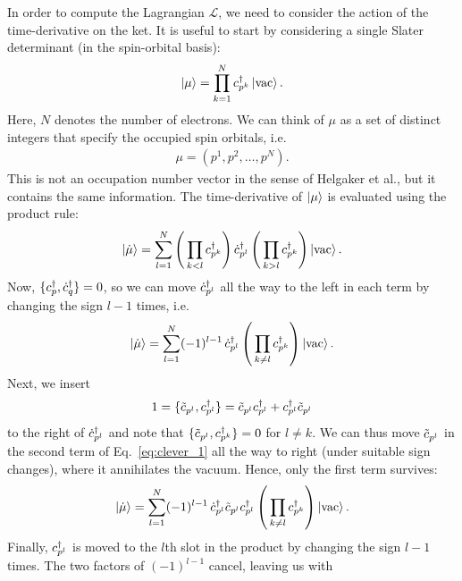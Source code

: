 \documentclass[aip,jcp,preprint,superscriptaddress,nofootinbib]{revtex4-1}
\begin{document}
In order to compute the Lagrangian $\mathcal{L}$, we need to consider
the action of the time-derivative on the ket. It is useful to start by
considering a single Slater determinant (in the spin-orbital basis):
\begin{align}
    \ket{\mu} = \prod_{k=1}^N c^{\dagger}_{p^{\smash{k}}} \ket{\mathrm{vac}}.
\end{align}
Here, $N$ denotes the number of electrons. 
We can think
of $\mu$ as a set of distinct integers that specify
the occupied spin orbitals, i.e.
\begin{align}
    \mu = (p^1, p^2, \ldots, p^N).
\end{align}
This is not an occupation number vector
in the sense of Helgaker et al.,\cite{helgakerMolecularElectronicstructureTheory2000}
but it contains the same information.
The time-derivative of
$\ket{\mu}$ is evaluated using the product rule:
\begin{align}
    \ket{\dot{\mu}} = \sum_{l=1}^{N} \left( \, \prod_{k < l} c^{\dagger}_{p^{\smash{k}}} \right) \dot{c}^{\dagger}_{p^{\smash{l}}} \left( \, \prod_{k > l} c^{\dagger}_{p^{\smash{k}}} \right) \ket{\mathrm{vac}}.
\end{align}
Now, $\{ c^{\dagger}_{p}, \dot{c}^{\dagger}_{q} \} = 0$, so we can move $\dot{c}^{\dagger}_{p^{\smash{l}}}$ all the way to the left in each term
by changing the sign $l - 1$ times, i.e.
\begin{align}
    \ket{\dot{\mu}} = \sum_{l=1}^{N} (-1)^{l-1} \, \dot{c}^{\dagger}_{p^{\smash{l}}} \left( \, \prod_{k \neq l} c^{\dagger}_{p^{\smash{k}}} \right) \ket{\mathrm{vac}}.
\end{align}
Next, we insert
\begin{align} \label{eq:clever_1}
    1 = \{ \tilde{c}_{{p}^{l}}, c^{\dagger}_{p^{\smash{l}}} \} = \tilde{c}_{{p}^{l}} c^{\dagger}_{p^{\smash{l}}} + c^{\dagger}_{p^{\smash{l}}} \tilde{c}_{{p}^{l}}
\end{align}
to the right of $\dot{c}^{\dagger}_{p^{\smash{l}}}$ and note that $\{ \tilde{c}_{{p}^{l}}, c^{\dagger}_{p^{\smash{k}}} \} = 0$ for $l \neq k$.
We can thus move $\tilde{c}_{{p}^{l}}$ in the second term of Eq.~\eqref{eq:clever_1} all the way to right
(under suitable sign changes), where it annihilates the vacuum. Hence, only the first term survives:
\begin{align}
    \ket{\dot{\mu}} = \sum_{l=1}^{N} (-1)^{l-1} \, \dot{c}^{\dagger}_{p^{\smash{l}}} \tilde{c}_{{p}^{l}} c^{\dagger}_{p^{\smash{l}}} \left( \, \prod_{k \neq l} c^{\dagger}_{p^{\smash{k}}} \right) \ket{\mathrm{vac}}.
\end{align}
Finally, $c^{\dagger}_{p^{\smash{l}}}$ is moved to the $l$th slot in the product by changing the sign $l - 1$ times.
The two factors of $(-1)^{l-1}$ cancel, leaving us with
\end{document}
